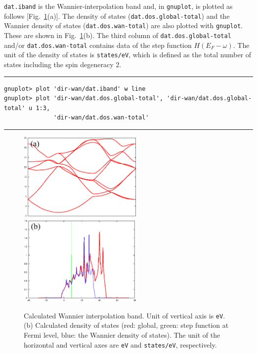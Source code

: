 \documentclass{article}
\begin{document}
{\tt dat.iband} is the Wannier-interpolation band and, in {\tt gnuplot}, is plotted as follows [Fig.~\ref{iband}(a)]. The density of states ({\tt dat.dos.global-total}) and the Wannier density of states ({\tt dat.dos.wan-total}) are also plotted with {\tt gnuplot}. These are shown in Fig.~\ref{iband}(b). The third column of {\tt dat.dos.global-total} and/or {\tt dat.dos.wan-total} contains data of the step function $H(E_F-\omega)$. The unit of the density of states is {\tt states/eV}, which is defined as the total number of states including the spin degeneracy 2. 
\vspace{3mm}\hrule
\begin{verbatim}
gnuplot> plot 'dir-wan/dat.iband' w line 
gnuplot> plot 'dir-wan/dat.dos.global-total', 'dir-wan/dat.dos.global-total' u 1:3, 
              'dir-wan/dat.dos.wan-total'
\end{verbatim}
\hrule\vspace{3mm}
\begin{figure}[H] 
\centering
\includegraphics[width=6cm]{dat.iband-Al.eps}
\includegraphics[width=6cm]{dat.dos-Al.eps}
\caption{Calculated Wannier interpolation band. Unit of vertical axis is {\tt eV}. (b) Calculated density of states (red: global, green: step function at Fermi level, blue: the Wannier density of states). The unit of the horizontal and vertical axes are {\tt eV} and {\tt states/eV}, respectively.} 
\label{iband}
\end{figure}
\end{document}
